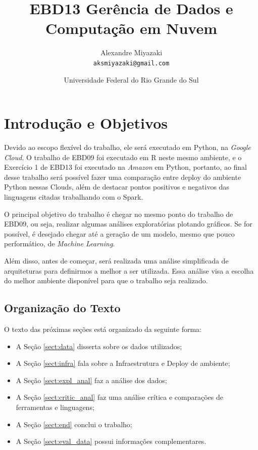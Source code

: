 \documentclass{article}
\title{EBD13 Gerência de Dados e Computação em Nuvem} %
\author{Alexandre Miyazaki\\ \texttt{aksmiyazaki@gmail.com}} %
\date{Universidade Federal do Rio Grande do Sul} %
\begin{document}
\maketitle %

\section{Introdução e Objetivos}
Devido ao escopo flexível do trabalho, ele será executado em Python, na \emph{Google Cloud}. O trabalho de EBD09 foi executado em R neste mesmo ambiente, e o Exercício 1 de EBD13 foi executado na \emph{Amazon} em Python, portanto, ao final desse trabalho será possível fazer uma comparação entre deploy do ambiente Python nessas Clouds, além de destacar pontos positivos e negativos das linguagens citadas trabalhando com o Spark.

O principal objetivo do trabalho é chegar no mesmo ponto do trabalho de EBD09, ou seja, realizar algumas análises exploratórias plotando gráficos. Se for possível, é desejado chegar até a geração de um modelo, mesmo que pouco performático, de \emph{Machine Learning}.

Além disso, antes de começar, será realizada uma análise simplificada de arquiteturas para definirmos a melhor a ser utilizada. Essa análise visa a escolha do melhor ambiente disponível para que o trabalho seja realizado.

\subsection{Organização do Texto}
O texto das próximas seções está organizado da seguinte forma:

\begin{itemize}
    \item A Seção \ref{sect:data} disserta sobre os dados utilizados;
    \item A Seção \ref{sect:infra} fala sobre a Infraestrutura e Deploy de ambiente;
    \item A Seção \ref{sect:expl_anal} faz a análise dos dados;
    \item A Seção \ref{sect:critic_anal} faz uma análise crítica e comparações de ferramentas e linguagens;
    \item A Seção \ref{sect:end} conclui o trabalho;
    \item A Seção \ref{sect:eval_data} possui informações complementares.
\end{itemize}
\end{document}
